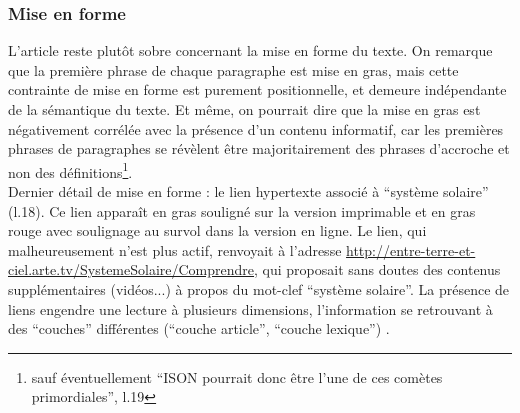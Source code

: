 \documentclass[a4paper,10pt]{article}
\begin{document}
		\subsubsection{Mise en forme}
			L'article reste plutôt sobre concernant la mise en forme du texte. On remarque que la première phrase de chaque paragraphe est mise en gras, mais cette contrainte de mise en forme est purement positionnelle, et demeure indépendante de la sémantique du texte. Et même, on pourrait dire que la mise en gras est négativement corrélée avec la présence d'un contenu informatif, car les premières phrases de paragraphes se révèlent être majoritairement des phrases d'accroche et non des définitions\footnote{sauf éventuellement ``ISON pourrait donc être l'une de ces comètes primordiales'', l.19}.\\
			Dernier détail de mise en forme : le lien hypertexte associé à ``système solaire'' (l.18). Ce lien apparaît en gras souligné sur la version imprimable et en gras rouge avec soulignage au survol dans la version en ligne. Le lien, qui malheureusement n'est plus actif, renvoyait à l'adresse \url{http://entre-terre-et-ciel.arte.tv/SystemeSolaire/Comprendre}, qui proposait sans doutes des contenus supplémentaires (vidéos...) à propos du mot-clef ``système solaire''. La présence de liens engendre une lecture à plusieurs dimensions, l'information se retrouvant à des ``couches'' différentes (``couche article'', ``couche lexique'') \cite{Toure2004}.
\end{document}
